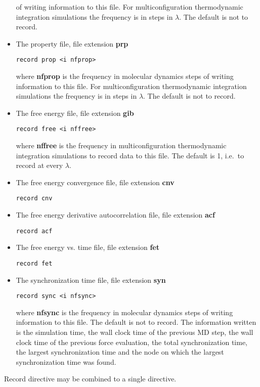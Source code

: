 \begin{itemize}
of writing information to this file. For multiconfiguration
thermodynamic integration simulations the frequency is in
steps in $\lambda$. The default is not to record.
\item
The property file, file extension {\bf prp}
\begin{verbatim}
record prop <i nfprop>
\end{verbatim}
where {\bf nfprop} is the frequency in molecular dynamics steps
of writing information to this file. For multiconfiguration
thermodynamic integration simulations the frequency is in
steps in $\lambda$. The default is not to record.
\item
The free energy file, file extension {\bf gib}
\begin{verbatim}
record free <i nffree>
\end{verbatim}
where {\bf nffree} is the frequency in multiconfiguration
thermodynamic integration simulations to record data to this file.
The default is 1, i.e.\ to record at every $\lambda$.
\item
The free energy convergence file, file extension {\bf cnv}
\begin{verbatim}
record cnv
\end{verbatim}
\item
The free energy derivative autocorrelation file, file extension {\bf acf}
\begin{verbatim}
record acf
\end{verbatim}
\item
The free energy vs. time file, file extension {\bf fet}
\begin{verbatim}
record fet
\end{verbatim}
\item
The synchronization time file, file extension {\bf syn}
\begin{verbatim}
record sync <i nfsync>
\end{verbatim}
where {\bf nfsync} is the frequency in molecular dynamics steps
of writing information to this file. The default is not to record.
The information written is the simulation time, the wall clock time
of the previous MD step, the wall clock time of the previous force
evaluation, the total synchronization time, the largest
synchronization time and the node on which the largest synchronization
time was found.
\end{itemize}
Record directive may be combined to a single directive.

